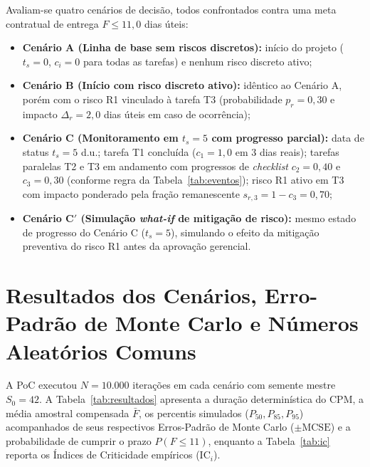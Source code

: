 \documentclass[12pt,openany,oneside,a4paper,english,brazilian,sumario=tradicional]{abntex2}
\newcommand{\IC}{\mathrm{IC}}
\begin{document}
Avaliam-se quatro cenários de decisão, todos confrontados contra uma meta contratual de entrega $F \le 11{,}0$ dias úteis:
\begin{itemize}
  \item \textbf{Cenário A (Linha de base sem riscos discretos):} início do projeto ($t_s=0$, $c_i=0$ para todas as tarefas) e nenhum risco discreto ativo;
  \item \textbf{Cenário B (Início com risco discreto ativo):} idêntico ao Cenário A, porém com o risco R1 vinculado à tarefa T3 (probabilidade $p_r=0{,}30$ e impacto $\Delta_r=2{,}0$ dias úteis em caso de ocorrência);
  \item \textbf{Cenário C (Monitoramento em $t_s=5$ com progresso parcial):} data de status $t_s=5$ d.u.; tarefa T1 concluída ($c_1=1{,}0$ em 3 dias reais); tarefas paralelas T2 e T3 em andamento com progressos de \textit{checklist} $c_2=0{,}40$ e $c_3=0{,}30$ (conforme regra da Tabela~\ref{tab:eventos}); risco R1 ativo em T3 com impacto ponderado pela fração remanescente $s_{r,3}=1-c_3=0{,}70$;
  \item \textbf{Cenário C$'$ (Simulação \textit{what-if} de mitigação de risco):} mesmo estado de progresso do Cenário C ($t_s=5$), simulando o efeito da mitigação preventiva do risco R1 antes da aprovação gerencial.
\end{itemize}

\section{Resultados dos Cenários, Erro-Padrão de Monte Carlo e Números Aleatórios Comuns}

A PoC executou $N=10.000$ iterações em cada cenário com semente mestre $S_0=42$. A Tabela~\ref{tab:resultados} apresenta a duração determinística do CPM, a média amostral compensada $\bar{F}$, os percentis simulados ($P_{50}, P_{85}, P_{95}$) acompanhados de seus respectivos Erros-Padrão de Monte Carlo ($\pm\mathrm{MCSE}$) e a probabilidade de cumprir o prazo $P(F \le 11)$, enquanto a Tabela~\ref{tab:ic} reporta os Índices de Criticidade empíricos ($\IC_i$).
\end{document}
